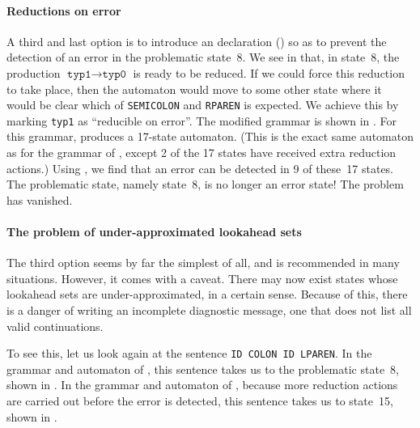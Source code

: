 \documentclass[onecolumn,11pt,nocopyrightspace,preprint]{sigplanconf}
\begin{document}

\paragraph{Reductions on error}

A third and last option is to introduce an \donerrorreduce declaration
() so as to prevent the detection of an error in the
problematic state~8. We see in  that, in
state~8, the production $\texttt{typ1} \rightarrow \texttt{typ0}$ is ready to
be reduced. If we could force this reduction to take place, then the automaton
would move to some other state where it would be clear which
of \verb+SEMICOLON+ and \verb+RPAREN+ is expected. We
achieve this by marking \verb+typ1+ as ``reducible on error''.
The modified grammar is shown
in .
For this grammar, \menhir produces a 17-state automaton.
(This is the exact same automaton as for the grammar of ,
except 2 of the 17 states have received extra reduction actions.)
Using \olisterrors, we find that an error can be detected in 9 of these~17 states.
The problematic state, namely state~8, is no longer an error state!
The problem has vanished.

\paragraph{The problem of under-approximated lookahead sets}

The third option seems by far the simplest of all, and is recommended in many
situations. However, it comes with a caveat. There may now exist states whose
lookahead sets are under-approximated, in a certain sense. Because of this,
there is a danger of writing an incomplete diagnostic message, one that does
not list all valid continuations.

To see this, let us look again at the sentence
\texttt{ID COLON ID LPAREN}. In the grammar and automaton of ,
this sentence takes us to the problematic state~8, shown in
. In the grammar and automaton of
, because more reduction actions are
carried out before the error is detected, this sentence takes us
to state~15, shown in .
\end{document}
